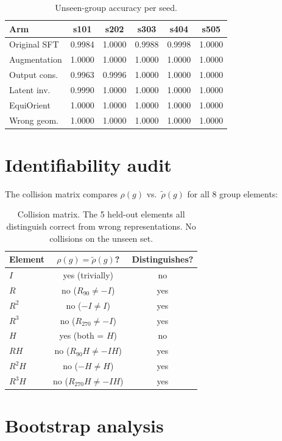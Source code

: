 \documentclass[10pt,letterpaper]{article}
\newcommand{\rhoop}{\rho}
\begin{document}
\begin{table}[h]
\centering\small
\begin{tabular}{lccccc}
\toprule
Arm & s101 & s202 & s303 & s404 & s505 \\
\midrule
Original SFT & 0.9984 & 1.0000 & 0.9988 & 0.9998 & 1.0000 \\
Augmentation & 1.0000 & 1.0000 & 1.0000 & 1.0000 & 1.0000 \\
Output cons. & 0.9963 & 0.9996 & 1.0000 & 1.0000 & 1.0000 \\
Latent inv. & 0.9990 & 1.0000 & 1.0000 & 1.0000 & 1.0000 \\
EquiOrient & 1.0000 & 1.0000 & 1.0000 & 1.0000 & 1.0000 \\
Wrong geom. & 1.0000 & 1.0000 & 1.0000 & 1.0000 & 1.0000 \\
\bottomrule
\end{tabular}
\caption{Unseen-group accuracy per seed.}
\end{table}

\section{Identifiability audit}

The collision matrix compares $\rhoop(g)$ vs.\ $\tilde{\rhoop}(g)$
for all 8 group elements:

\begin{table}[h]
\centering\small
\begin{tabular}{lcc}
\toprule
Element & $\rhoop(g) = \tilde{\rhoop}(g)$? & Distinguishes? \\
\midrule
$I$ & yes (trivially) & no \\
$R$ & no ($R_{90} \neq -I$) & yes \\
$R^2$ & no ($-I \neq I$) & yes \\
$R^3$ & no ($R_{270} \neq -I$) & yes \\
$H$ & yes (both = $H$) & no \\
$RH$ & no ($R_{90}H \neq -IH$) & yes \\
$R^2H$ & no ($-H \neq H$) & yes \\
$R^3H$ & no ($R_{270}H \neq -IH$) & yes \\
\bottomrule
\end{tabular}
\caption{Collision matrix. The 5 held-out elements all distinguish
correct from wrong representations. No collisions on the unseen set.}
\end{table}

\section{Bootstrap analysis}
\end{document}

